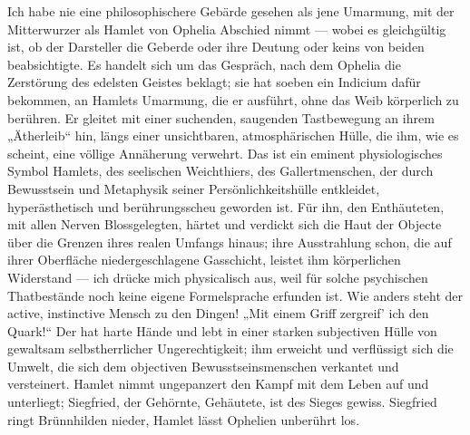 Ich habe nie eine philosophischere Gebärde gesehen als jene Umarmung, mit der Mitterwurzer als Hamlet von Ophelia Abschied nimmt — wobei es gleichgültig ist, ob der Darsteller die Geberde oder ihre Deutung oder keins von beiden beabsichtigte. Es handelt sich um das Gespräch, nach dem Ophelia die Zerstörung des edelsten Geistes beklagt; sie hat soeben ein Indicium dafür bekommen, an Hamlets Umarmung, die er ausführt, ohne das Weib körperlich zu berühren. Er gleitet mit einer suchenden, saugenden Tastbewegung an ihrem „Ätherleib“ hin, längs einer unsichtbaren, atmosphärischen Hülle, die ihm, wie es scheint, eine völlige Annäherung verwehrt. Das ist ein eminent physiologisches Symbol Hamlets, des seelischen Weichthiers, des Gallertmenschen, der durch Bewusstsein und Metaphysik seiner Persönlichkeitshülle entkleidet, hyperästhetisch und berührungsscheu geworden ist. Für ihn, den Enthäuteten, mit allen Nerven Blossgelegten, härtet und verdickt sich die Haut der Objecte über die Grenzen ihres realen Umfangs hinaus; ihre Ausstrahlung schon, die auf ihrer Oberfläche niedergeschlagene Gasschicht, leistet ihm körperlichen Widerstand — ich drücke mich physicalisch aus, weil für solche psychischen Thatbestände noch keine eigene Formelsprache erfunden ist. Wie anders steht der active, instinctive Mensch zu den Dingen! „Mit einem Griff zergreif’ ich den Quark!“ Der hat harte Hände und lebt in einer starken subjectiven Hülle von gewaltsam selbstherrlicher Ungerechtigkeit; ihm erweicht und verflüssigt sich die Umwelt, die sich dem objectiven Bewusstseinsmenschen verkantet und versteinert. Hamlet nimmt ungepanzert den Kampf mit dem Leben auf und unterliegt; Siegfried, der Gehörnte, Gehäutete, ist des Sieges gewiss. Siegfried ringt Brünnhilden nieder, Hamlet lässt Ophelien unberührt los.
\par

